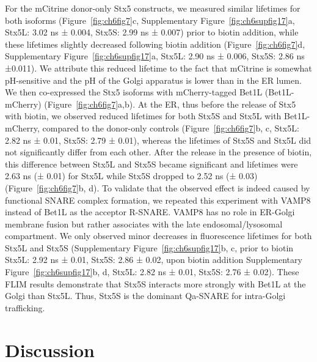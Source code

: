 For the mCitrine donor-only Stx5 constructs, we measured similar lifetimes for both isoforms (Figure~\ref{fig:ch6fig7}c, Supplementary Figure~\ref{fig:ch6supfig17}a, Stx5L: 3.02 ns ± 0.004, Stx5S: 2.99 ns ± 0.007) prior to biotin addition, while these lifetimes slightly decreased following biotin addition (Figure~\ref{fig:ch6fig7}d, Supplementary Figure~\ref{fig:ch6supfig17}a, Stx5L: 2.90 ns ± 0.006, Stx5S: 2.86 ns ±0.011). We attribute this reduced lifetime to the fact that mCitrine is somewhat pH-sensitive\cite{griesbeck_reducing_2001} and the pH of the Golgi apparatus is lower than in the ER lumen\cite{casey_sensors_2010}. We then co-expressed the Stx5 isoforms with mCherry-tagged Bet1L (Bet1L-mCherry) (Figure~\ref{fig:ch6fig7}a,b). At the ER, thus before the release of Stx5 with biotin, we observed reduced lifetimes for both Stx5S and Stx5L with Bet1L-mCherry, compared to the donor-only controls (Figure~\ref{fig:ch6fig7}b, c, Stx5L: 2.82 ns ± 0.01, Stx5S: 2.79 ± 0.01), whereas the lifetimes of Stx5S and Stx5L did not significantly differ from each other. After the release in the presence of biotin, this difference between Stx5L and Stx5S became significant and lifetimes were 2.63 ns (± 0.01) for Stx5L while Stx5S dropped to 2.52 ns (± 0.03) (Figure~\ref{fig:ch6fig7}b, d). To validate that the observed effect is indeed caused by functional SNARE complex formation, we repeated this experiment with VAMP8 instead of Bet1L as the acceptor R-SNARE. VAMP8 has no role in ER-Golgi membrane fusion but rather associates with the late endosomal/lysosomal compartment\cite{dingjan_endosomal_2018,verboogen_fluorescence_2017,antonin_r-snare_2000,bajno_focal_2000,hong_snares_2005,manderson_subcompartments_2007,murray_role_2005}. We only observed minor decreases in fluorescence lifetimes for both Stx5L and Stx5S (Supplementary Figure~\ref{fig:ch6supfig17}b, c, prior to biotin Stx5L: 2.92 ns ± 0.01, Stx5S: 2.86 ± 0.02, upon biotin addition Supplementary Figure~\ref{fig:ch6supfig17}b, d, Stx5L: 2.82 ns ± 0.01, Stx5S: 2.76 ± 0.02). These FLIM results demonstrate that Stx5S interacts more strongly with Bet1L at the Golgi than Stx5L. Thus, Stx5S is the dominant Qa-SNARE for intra-Golgi trafficking.

\clearpage

\section{Discussion}

